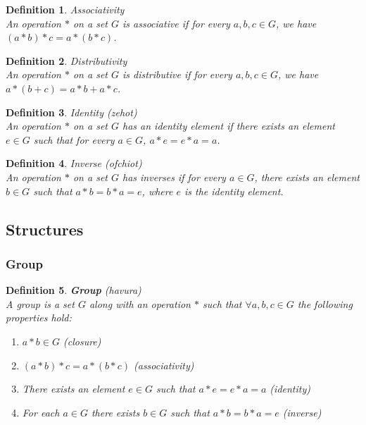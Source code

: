 \documentclass[11pt]{book} %
\newtheorem{definition}{Definition}[section]
\begin{document}
\begin{definition}{Associativity} \\
An operation \(*\) on a set \(G\) is associative if for every \(a, b, c \in G\), we have \((a * b) * c = a * (b * c)\).
\end{definition}

\begin{definition}{Distributivity} \\
An operation \(*\) on a set \(G\) is distributive if for every \(a, b, c \in G\), we have \(a * (b + c) = a * b + a * c\).
\end{definition}

\begin{definition}{Identity (zehot)} \\
An operation \(*\) on a set \(G\) has an identity element if there exists an element \(e \in G\) such that for every \(a \in G\), \(a * e = e * a = a\).
\end{definition}

\begin{definition}{Inverse (ofchiot)} \\
An operation \(*\) on a set \(G\) has inverses if for every \(a \in G\), there exists an element \(b \in G\) such that \(a * b = b * a = e\), where \(e\) is the identity element.
\end{definition}

\subsection{Structures}
\subsubsection{Group}
\begin{definition}{\textbf{Group} (havura)} \\
A group is a set \(G\) along with an operation \(*\) such that $\forall a, b, c \in G$ the following properties hold:
\begin {enumerate}
    \item \(a * b \in G\) (closure)
    \item \((a * b) * c = a * (b * c)\) (associativity)
    \item There exists an element \(e \in G\) such that \(a * e = e * a = a\) (identity)
    \item For each \(a \in G\) there exists \(b \in G\) such that \(a * b = b * a = e\) (inverse)
\end{enumerate}
\end{definition}
\end{document}
